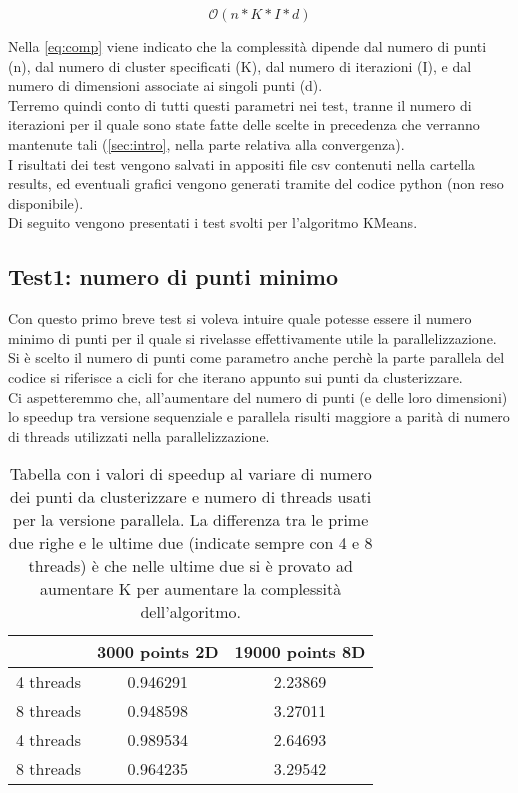 \documentclass[10pt,twocolumn,letterpaper]{article}
\begin{document}
\begin{equation}
\label{eq:comp}
    \mathcal{O}(n * K * I * d)
\end{equation}

Nella \cref{eq:comp} viene indicato che la complessità dipende dal numero di punti (n), dal numero di cluster specificati (K), dal numero di iterazioni (I), e dal numero di dimensioni associate ai singoli punti (d).\\
Terremo quindi conto di tutti questi parametri nei test, tranne il numero di iterazioni per il quale sono state fatte delle scelte in precedenza che verranno mantenute tali (\cref{sec:intro}, nella parte relativa alla convergenza).\\
I risultati dei test vengono salvati in appositi file csv contenuti nella cartella results, ed eventuali grafici vengono generati tramite del codice python (non reso disponibile).\\
Di seguito vengono presentati i test svolti per l'algoritmo KMeans.

\subsection{Test1: numero di punti minimo}
\label{sec:t1}
Con questo primo breve test si voleva intuire quale potesse essere il numero minimo di punti per il quale si rivelasse effettivamente utile la parallelizzazione. Si è scelto il numero di punti come parametro anche perchè la parte parallela del codice si riferisce a cicli for che iterano appunto sui punti da clusterizzare.\\
Ci aspetteremmo che, all'aumentare del numero di punti (e delle loro dimensioni) lo speedup tra versione sequenziale e parallela risulti maggiore a parità di numero di threads utilizzati nella parallelizzazione.\\

\begin{table}[h]
\centering
\begin{tabular}{ |c|c|c| } 
\hline
 & 3000 points 2D & 19000 points 8D \\
\hline
4 threads & 0.946291 & 2.23869\\
\hline
8 threads & 0.948598 & 3.27011\\
\hline
4 threads & 0.989534 & 2.64693\\
\hline
8 threads & 0.964235 & 3.29542\\
\hline
\end{tabular}
\vspace*{3mm}
\caption{Tabella con i valori di speedup al variare di numero dei punti da clusterizzare e numero di threads usati per la versione parallela. La differenza tra le prime due righe e le ultime due (indicate sempre con 4 e 8 threads) è che nelle ultime due si è provato ad aumentare K per aumentare la complessità dell'algoritmo.}
\label{table:t1}
\end{table}
\end{document}
